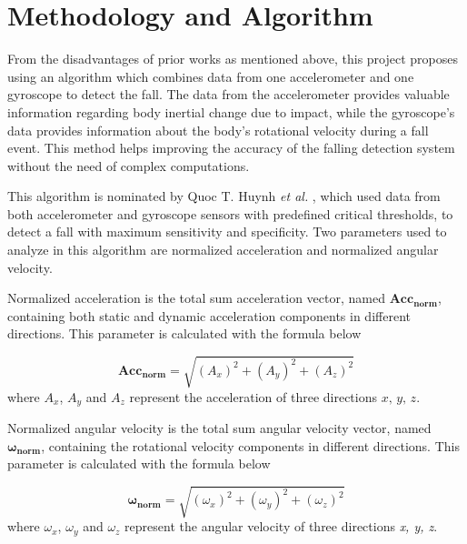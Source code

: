 \documentclass[letterpaper,12pt,titlepage,oneside,final]{book}
\begin{document}
\section{Methodology and Algorithm}
From the disadvantages of prior works as mentioned above, this project proposes using an algorithm which combines data from one accelerometer and one gyroscope to detect the fall. The data from the accelerometer provides valuable information regarding body inertial change due to impact, while the gyroscope's data provides information about the body's rotational velocity during a fall event. This method helps improving the accuracy of the falling detection system without the need of complex computations.  \par
This algorithm is nominated by Quoc T. Huynh \textit{et al.} \cite{main_quoc}, which used data from both accelerometer and gyroscope sensors with predefined critical thresholds, to detect a fall with maximum sensitivity and specificity. Two parameters used to analyze in this algorithm are normalized acceleration and normalized angular velocity. \par

Normalized acceleration is the total sum acceleration vector, named $\boldsymbol{Acc_{norm}}$, containing both static and dynamic acceleration components in different directions. This parameter is calculated with the formula below 

\begin{equation}
\boldsymbol{Acc_{norm}}=\sqrt{(A_x)^2+(A_y)^2+(A_z)^2}
\end{equation}
where $A_x$, $A_y$ and $A_z$ represent the acceleration of three directions $\textit{x, y, z}$. \par 
Normalized angular velocity is the total sum angular velocity vector, named $\boldsymbol{\omega_{norm}}$, containing the rotational velocity components in different directions. This parameter is calculated with the formula below

\begin{equation}
\boldsymbol{\omega_{norm}}=\sqrt{(\omega_{x})^2+(\omega_{y})^2+(\omega_{z})^2}
\end{equation}
where $\omega_x$, $\omega_y$ and $\omega_z$ represent the angular velocity of three directions \textit{x, y, z}.
\end{document}
